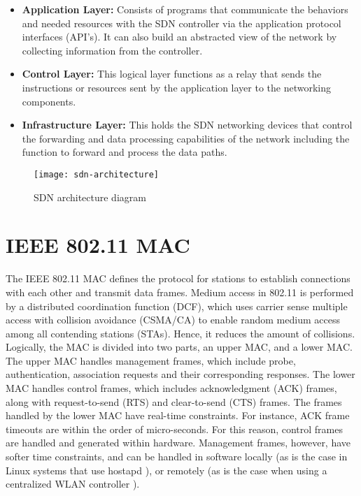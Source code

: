 \begin{itemize}
	\item \textbf{Application Layer:}  Consists of programs that communicate the behaviors and needed resources with the SDN controller via the application protocol interfaces (API’s). It can also build an abstracted view of the network by collecting information from the controller.
	\item \textbf{Control Layer:} This logical layer functions as a relay that sends the instructions or resources sent by the application layer to the networking components.
	\item \textbf{Infrastructure Layer:} This holds the SDN networking devices that control the forwarding and data processing capabilities of the network including the function to forward and process the data paths.
\end{itemize}

\begin{figure}
  \centering
  \texttt{[image: sdn-architecture]}
  \caption{SDN architecture diagram\cite{SDN:architecture}}
  \label{fig:sdn-architecture}
\end{figure}

\section{IEEE 802.11 MAC \cite{ieee2012802}}\label{sec:IEEE802.11}

The IEEE 802.11 \gls{MAC} \cite{ieee2012802} defines the protocol for stations to establish connections with each other and transmit data frames.
Medium access in 802.11 is performed by a distributed coordination function (DCF), which uses carrier sense multiple access with collision avoidance (CSMA/CA) to enable random medium access among all contending stations (STAs). Hence, it reduces the amount of collisions. Logically, the MAC is divided into two parts, an upper MAC, and a lower MAC. The upper MAC handles management frames, which include probe, authentication, association requests and their corresponding responses. The lower MAC handles control frames, which includes acknowledgment (ACK) frames, along with request-to-send (RTS) and clear-to-send (CTS) frames. The frames handled by the lower MAC have real-time constraints. For instance, ACK frame timeouts are within the order of micro-seconds. For this reason, control frames are handled and generated within hardware. Management frames, however, have softer time constraints, and can be handled in software locally (as is the case in Linux systems that use hostapd \cite{hostapd}), or remotely (as is the case when using a centralized WLAN controller \cite{RFC5412L97} ).

